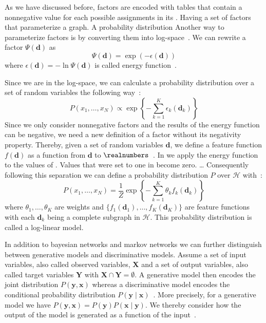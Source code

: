 As we have discussed before, \glspl{factor} are encoded with tables that contain a nonnegative value for each possible assignments in its .
Having a set of \glspl{factor} that parameterize a graph. A probability distribution
Another way to parameterize \glspl{factor} is by converting them into log-space~\citep{koller2009probabilistic}.
We can rewrite a factor $\Psi(\mathbf{d})$ as
\begin{equation*}
  \label{equ:energy-function}
  \Psi(\mathbf{d}) = \exp(-\epsilon(\mathbf{d}))
\end{equation*}
where $\epsilon(\mathbf{d})=-\ln\Psi(\mathbf{d})$ is called \gls{energy function}~\citep{koller2009probabilistic}.

Since we are in the log-space, we can calculate a \gls{probability distribution} over a set of \glspl{random variable} the following way~\citep{koller2009probabilistic}:
\begin{equation}
  \label{equ:p-energy-function}
  P\left(x_1,\dots,x_N\right) \propto \exp\left\{-\sum_{k=1}^K\epsilon_k\left(\mathbf{d}_k\right)\right\}
\end{equation}
Since we only consider nonnegative \glspl{factor} and the results of the \gls{energy function} can be negative, we need a new definition of a \gls{factor} without its negativity property.
Thereby, given a set of \glspl{random variable} $\mathbf{d}$, we define a \gls{feature function} $f(\mathbf{d})$ as a function from $\mathbf{d}$ to $\realnumbers$~\citep{koller2009probabilistic}.
In  we apply the \gls{energy function} to the values of .
Values that were set to one in  become zero. \dots{}
Consequently following this separation we can define a \gls{probability distribution} $P$ over $\mathcal{H}$ with~\citep{koller2009probabilistic}:
\begin{equation}
  \label{equ:log-linear-model}
  P\left(x_1,\dots,x_N\right) = \frac{1}{Z}\exp\left\{-\sum_{k=1}^K \theta_k f_k\left(\mathbf{d}_k\right)\right\}
\end{equation}
where $\theta_1,\dots,\theta_K$ are weights and $\{f_1(\mathbf{d}_1),\dots,f_K(\mathbf{d}_K)\}$ are \glspl{feature function} with each $\mathbf{d}_k$ being a complete subgraph in $\mathcal{H}$.
This \gls{probability distribution} is called a \gls{log-linear model}.

\bigskip

In addition to \glspl{bayesian network} and \glspl{markov network} we can further distinguish between \glspl{generative model} and \glspl{discriminative model}.
Assume a set of input variables, also called \glspl{observed variable}, $\mathbf{X}$ and a set of output variables, also called \glspl{target variable} $\mathbf{Y}$ with $\mathbf{X}\cap\mathbf{Y}=\emptyset$.
A \gls{generative model} then encodes the \gls{joint distribution} $P(\mathbf{y},\mathbf{x})$ whereas a \gls{discriminative model} encodes the \gls{conditional probability distribution} $P(\mathbf{y}\mid\mathbf{x})$~\citep{koller2009probabilistic}.
More precisely, for a \gls{generative model} we have $P(\mathbf{y},\mathbf{x})=P(\mathbf{y})P(\mathbf{x}\mid\mathbf{y})$.
We thereby consider how the output of the model is generated as a function of the input~\citep{sutton2010introduction}.

